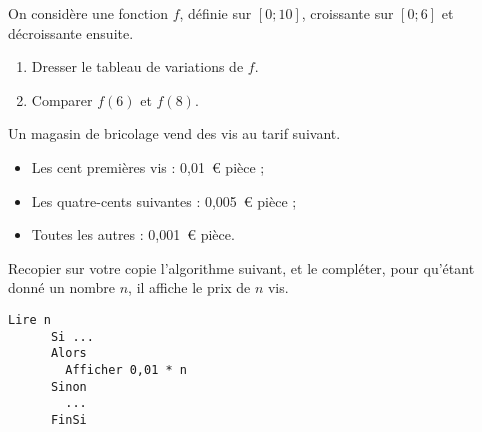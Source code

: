 \documentclass[12pt]{article}
\begin{document}
\begin{exercice}
\begin{enumerate}
\begin{center}
      \end{center}
  \end{enumerate}

\end{exercice}

\pagebreak

\begin{exercice}
  On considère une fonction $f$, définie sur $\left[ 0;10 \right]$, croissante sur $\left[ 0;6 \right]$ et décroissante ensuite.

      \begin{enumerate}
        \item Dresser le tableau de variations de $f$.
        \item Comparer $f(6)$ et $f(8)$.
      \end{enumerate}
\end{exercice}

\begin{exercice}
  Un magasin de bricolage vend des vis au tarif suivant.
  \begin{itemize}[$\bullet$]
    \item Les cent premières vis : 0,01~\euro{} pièce ;
    \item Les quatre-cents suivantes : 0,005~\euro{} pièce ;
    \item Toutes les autres : 0,001~\euro{} pièce.
  \end{itemize}

  Recopier sur votre copie l'algorithme suivant, et le compléter, pour qu'étant donné un nombre $n$, il affiche le prix de $n$ vis.
      \begin{lstlisting}[language=naturel,frame=lines,mathescape=true]
      Lire n
      Si ...
      Alors
        Afficher 0,01 * n
      Sinon
        ...
      FinSi
      \end{lstlisting}
\end{exercice}
\end{document}
